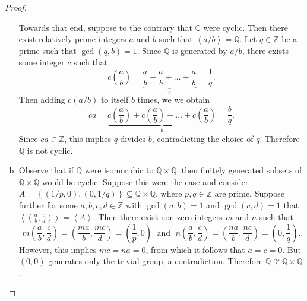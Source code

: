 \documentclass[10pt]{amsart}
\begin{document}
\begin{thm}
\begin{proof}
\begin{enumerate}[(a)]
      Towards that end, suppose to the contrary that $\mathbb{Q}$ were cyclic.
      Then there exist relatively prime integers $a$ and $b$ such that $\left<a/b\right> = \mathbb{Q}$.
      Let $q \in \mathbb{Z}$ be a prime such that $\gcd(q,b) = 1$.
      Since $\mathbb{Q}$ is generated by $a/b$, there exists some integer $c$ such that 
      $$c\left(\frac{a}{b}\right) = \underbrace{\frac{a}{b} + \frac{a}{b} + \ldots + \frac{a}{b}}_c = \frac{1}{q}.$$
      Then adding $c(a/b)$ to itself $b$ times, we we obtain 
      $$ca = \underbrace{c\left(\frac{a}{b}\right) +  c\left(\frac{a}{b}\right) + \ldots + c\left(\frac{a}{b}\right)}_b =  \frac{b}{q}.$$
      Since $ca \in \mathbb{Z}$, this implies $q$ divides $b$, contradicting the choice of $q$.
      Therefore $\mathbb{Q}$ is not cyclic.
    \item
      Observe that if $\mathbb{Q}$ were isomorphic to $\mathbb{Q} \times \mathbb{Q}$, then finitely generated subsets of $\mathbb{Q} \times \mathbb{Q}$ would be cyclic.
      Suppose this were the case and consider $A = \left\{(1/p, 0), (0, 1/q)\right\} \subseteq \mathbb{Q} \times \mathbb{Q}$, where $p, q \in \mathbb{Z}$ are prime.
      Suppose further for some $a,b,c,d \in \mathbb{Z}$ with $\gcd(a,b) = 1$ and $\gcd(c,d) = 1$ that $\left<(\frac{a}{b}, \frac{c}{d})\right> = \left<A\right>$.
      Then there exist non-zero integers $m$ and $n$ such that 
      $$m\left(\frac{a}{b}, \frac{c}{d}\right) = \left(\frac{ma}{b}, \frac{mc}{d}\right) = \left(\frac{1}{p},0\right) \;\text{ and }\; n\left(\frac{a}{b}, \frac{c}{d}\right) = \left(\frac{na}{b}, \frac{nc}{d}\right) = \left(0,\frac{1}{q}\right).$$
      However, this implies $mc = na = 0$, from which it follows that $a = c = 0$.
      But $(0,0)$ generates only the trivial group, a contradiction.
      Therefore $\mathbb{Q} \not \cong \mathbb{Q} \times \mathbb{Q}$.
    \end{enumerate}
  \end{proof}
\end{thm}
\end{document}
